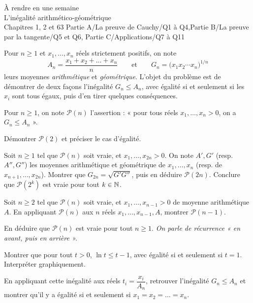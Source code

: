 
  {À rendre en une semaine\\L'inégalité arithmético-géométrique\\Chapitres 1, 2 et 6}{3}
  {Partie A/La preuve de Cauchy/Q1 à Q4,Partie B/La preuve par la tangente/Q5 et Q6,%
   Partie C/Applications/Q7 à Q11}
\enParties
{}

Pour $n\geqslant1$ et $x_1,\dots,x_n$ réels strictement positifs, on note
\[A_n=\frac{x_1+x_2+\dots+x_n}{n}\qquad\text{et}\qquad G_n=\bigl(x_1x_2\cdots x_n\bigr)^{1/n}\]
leurs moyennes \emph{arithmétique} et \emph{géométrique}. L'objet du problème
est de démontrer de deux façons l'inégalité $G_n\leqslant A_n$, avec égalité si
et seulement si les $x_i$ sont tous égaux, puis d'en tirer quelques
conséquences.

\begin{exoEval}{}{}
Pour $n\geqslant1$, on note $\mathcal{P}(n)$ l'assertion : « pour tous réels
$x_1,\dots,x_n>0$, on a $G_n\leqslant A_n$ ».
\begin{questions}
  \item Démontrer $\mathcal{P}(2)$ et préciser le cas d'égalité.
  \item Soit $n\geqslant1$ tel que $\mathcal{P}(n)$ soit vraie, et
    $x_1,\dots,x_{2n}>0$. On note $A',G'$ (resp. $A'',G''$) les moyennes
    arithmétique et géométrique de $x_1,\dots,x_n$ (resp. de
    $x_{n+1},\dots,x_{2n}$). Montrer que $G_{2n}=\sqrt{G'G''}$, puis en
    déduire $\mathcal{P}(2n)$. Conclure que $\mathcal{P}(2^{k})$ est vraie
    pour tout $k\in\mathbb{N}$.
  \item Soit $n\geqslant2$ tel que $\mathcal{P}(n)$ soit vraie, et
    $x_1,\dots,x_{n-1}>0$ de moyenne arithmétique $A$. En appliquant
    $\mathcal{P}(n)$ aux $n$ réels $x_1,\dots,x_{n-1},A$, montrer
    $\mathcal{P}(n-1)$.
  \item En déduire que $\mathcal{P}(n)$ est vraie pour tout $n\geqslant1$.
    \emph{On parle de récurrence « en avant, puis en arrière ».}
\end{questions}
\end{exoEval}

\begin{exoEval}{}{}
\begin{questions}[start=5]
  \item Montrer que pour tout $t>0$, $\ln t\leqslant t-1$, avec égalité si
    et seulement si $t=1$. Interpréter graphiquement.
  \item En appliquant cette inégalité aux réels $t_i=\dfrac{x_i}{A_n}$,
    retrouver l'inégalité $G_n\leqslant A_n$ et montrer qu'il y a égalité si
    et seulement si $x_1=x_2=\dots=x_n$.
\end{questions}
\end{exoEval}

